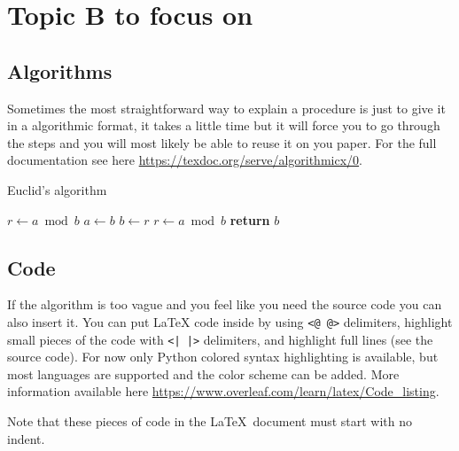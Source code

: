 \documentclass{project-logbook}
\begin{document}



\section{Topic B to focus on} \label{sec:topic_B}

	\subsection{Algorithms} \label{sub:algorithms}

		\begin{HighlightedNote}{}
			Sometimes the most straightforward way to explain a procedure is just to give it in a algorithmic format, it takes a little time but it will force you to go through the steps and you will most likely be able to reuse it on you paper. For the full documentation see here \url{https://texdoc.org/serve/algorithmicx/0}.
		\end{HighlightedNote}

		\begin{algorithm}
			\caption{Euclid’s algorithm}\label{alg:euclid}
			\begin{algorithmic}[1]
					\State $r\gets a\bmod b$
						\State $a\gets b$
						\State $b\gets r$
						\State $r\gets a\bmod b$
					\EndWhile\label{euclidendwhile}
					\State \textbf{return} $b$
				\EndProcedure
			\end{algorithmic}
		\end{algorithm}


	\subsection{Code} \label{sub:code}
		\begin{HighlightedNote}{}
			If the algorithm is too vague and you feel like you need the source code you can also insert it. You can put LaTeX code inside by using \texttt{<@ @>} delimiters, highlight small pieces of the code with \texttt{<| |>} delimiters, and highlight full lines (see the source code). For now only Python colored syntax highlighting is available, but most languages are supported and the color scheme can be added. More information available here \url{https://www.overleaf.com/learn/latex/Code_listing}.

			Note that these pieces of code in the \LaTeX~document must start with no indent.
		\end{HighlightedNote}
\end{document}
